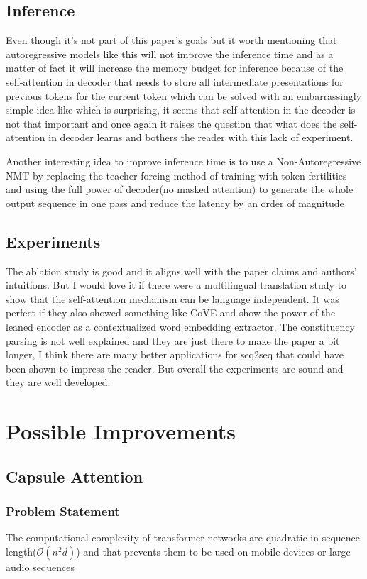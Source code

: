 \documentclass{article}
\begin{document}
\subsection{Inference}
Even though it’s not part of this paper’s goals but it worth mentioning that autoregressive models like this will not improve the inference time and as a matter of fact it will increase the memory budget for inference because of the self-attention in decoder that needs to store all intermediate presentations for previous tokens for the current token which can be solved with an embarrassingly simple idea like \citep{1805.00631} which is surprising, it seems that self-attention in the decoder is not that important and once again it raises the question that what does the self-attention in decoder learns and bothers the reader with this lack of experiment.

Another interesting idea to improve inference time is to use a Non-Autoregressive NMT by replacing the teacher forcing method of training with token fertilities and using the full power of decoder(no masked attention) to generate the whole output sequence in one pass and reduce the latency by an order of magnitude\citep{1711.02281}

\subsection{Experiments}
The ablation study is good and it aligns well with the paper claims and authors’ intuitions. But I would love it if there were a multilingual translation study to show that the self-attention mechanism can be language independent. It was perfect if they also showed something like CoVE\citep{1708.00107} and show the power of the leaned encoder as a contextualized word embedding extractor.
The constituency parsing is not well explained and they are just there to make the paper a bit longer, I think there are many better applications for seq2seq that could have been shown to impress the reader. But overall the experiments are sound and they are well developed.

\section{Possible Improvements}
\subsection{Capsule Attention}
\subsubsection{Problem Statement}
The computational complexity of transformer networks are quadratic in sequence length($\mathcal{O}(n^{2}d)$) and that prevents them to be used on mobile devices or large audio sequences
\end{document}

